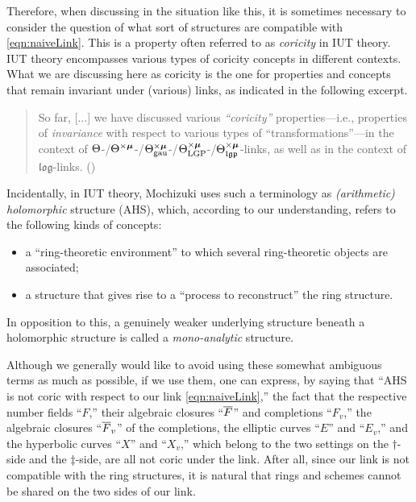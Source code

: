 \documentclass[12pt, reqno, a4paper]{amsart}
\def\bmu{\bm{\mu}}
\begin{document}
Therefore, when discussing in the situation like this, it is sometimes necessary to consider the question of what sort of structures are compatible with \eqref{eqn:naiveLink}.
This is a property often referred to as {\it coricity} in IUT theory. IUT theory encompasses various types of coricity concepts in different contexts. What we are discussing here as coricity is the one for properties and concepts that remain invariant under (various) links, as indicated in the following excerpt.

\medskip\noindent
\begin{quote}
So far, [...] we have
discussed various {\it ``coricity''} properties---i.e., properties
of {\it invariance} with respect to various types of
``transformations''---in the context of 
$\Th$-/$\Th^{\times\bmu}$-/$\Th^{\times\bmu}_{\text{gau}}$-/$\Th^{\times\bmu}_{\LGP}$-/$\Th^{\times\bmu}_{\mathfrak{lgp}}$-links, as
well as in the context of $\mathfrak{log}$-links. (\cite[Introduction, p.\ 408]{MR4225475})
\end{quote}

\medskip
Incidentally, in IUT theory, Mochizuki uses such a terminology as {\em (arithmetic) holomorphic} structure (AHS), which, according to our understanding, refers to the following kinds of concepts:
\begin{itemize}
    \item a ``ring-theoretic environment'' to which several ring-theoretic objects are associated;
    \item a structure that gives rise to a ``process to reconstruct'' the ring structure.
\end{itemize}
In opposition to this, a genuinely weaker underlying structure beneath a holomorphic structure is called a {\em mono-analytic} structure.

Although we generally would like to avoid using these somewhat ambiguous terms as much as possible, if we use them, one can express, by saying that ``AHS is not coric with respect to our link \eqref{eqn:naiveLink},'' the fact that the respective number fields ``$F$,'' their algebraic closures ``$\oF$'' and completions ``$F_v$,'' the algebraic closures ``$\oF_v$'' of the completions, the elliptic curves ``$E$'' and ``$E_v$,'' and the hyperbolic curves ``$X$'' and ``$X_v$,'' which belong to the two settings on the $\dag$-side and the $\ddag$-side, are all not coric under the link.
After all, since our link is not compatible with the ring structures, it is natural that rings and schemes cannot be shared on the two sides of our link.
\end{document}
